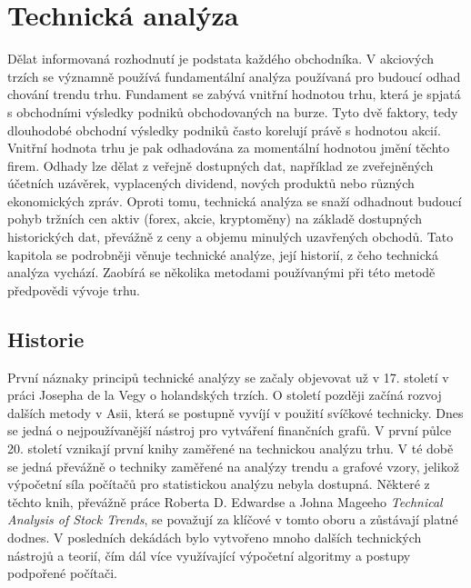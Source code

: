 \chapter{Technická analýza}
\label{chap:TechnicalAnalysis}
Dělat informovaná rozhodnutí je podstata každého obchodníka. V akciových trzích se významně používá fundamentální analýza používaná pro budoucí odhad
chování trendu trhu. Fundament se zabývá vnitřní hodnotou trhu, která je spjatá s obchodními výsledky podniků obchodovaných na burze. Tyto dvě faktory,
tedy dlouhodobé obchodní výsledky podniků často korelují právě s hodnotou akcií. Vnitřní hodnota trhu je pak odhadována za momentální hodnotou jmění
těchto firem. Odhady lze dělat z veřejně dostupných dat, například ze zveřejněných účetních uzávěrek, vyplacených dividend, nových produktů nebo různých ekonomických zpráv.
Oproti tomu, technická analýza se snaží odhadnout budoucí pohyb tržních cen aktiv (forex, akcie, kryptoměny) na základě dostupných historických dat, převážně
z ceny a objemu minulých uzavřených obchodů. Tato kapitola se podrobněji věnuje technické analýze, její historií, z čeho technická analýza vychází.
Zaobírá se několika metodami používanými při této metodě předpovědi vývoje trhu.


\section{Historie}
První náznaky principů technické analýzy se začaly objevovat už v 17. století v práci Josepha de la Vegy o holandských trzích. O století později začíná
rozvoj dalších metody v Asii, která se postupně vyvíjí v použití svíčkové technicky. Dnes se jedná o nejpoužívanější nástroj pro vytváření finančních grafů.
V první půlce 20. století vznikají první knihy zaměřené na technickou analýzu trhu. V té době se jedná převážně o techniky zaměřené na analýzy trendu a
grafové vzory, jelikož výpočetní síla počítačů pro statistickou analýzu nebyla dostupná. Některé z těchto knih, převážně práce Roberta D. Edwardse a Johna
Mageeho \emph{Technical Analysis of Stock Trends}, se považují za klíčové v tomto oboru a zůstávají platné dodnes. V posledních dekádách bylo vytvořeno
mnoho dalších technických nástrojů a teorií, čím dál více využívající výpočetní algoritmy a postupy podpořené počítači.


